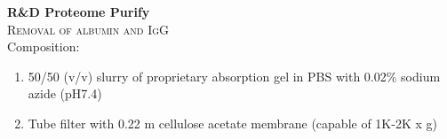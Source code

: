 \textbf{R&D Proteome Purify} 
\\
\textsc{Removal of albumin and IgG}
\\
Composition: 
\begin{enumerate}
\item{50/50 (v/v) slurry of proprietary absorption gel in PBS with 0.02\% sodium azide (pH7.4)}
\item{Tube filter with 0.22 \mu m cellulose acetate membrane (capable of 1K-2K x g)}
\end{enumerate}

